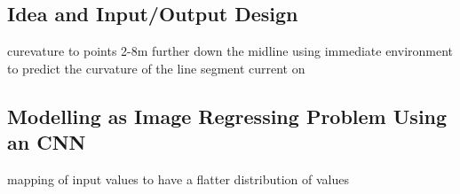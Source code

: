 \subsection{Idea and Input/Output Design}
curevature to points 2-8m further down the midline
using immediate environment to predict the curvature of the line segment current on
\subsection{Modelling as Image Regressing Problem Using an CNN}
mapping of input values to have a flatter distribution of values
